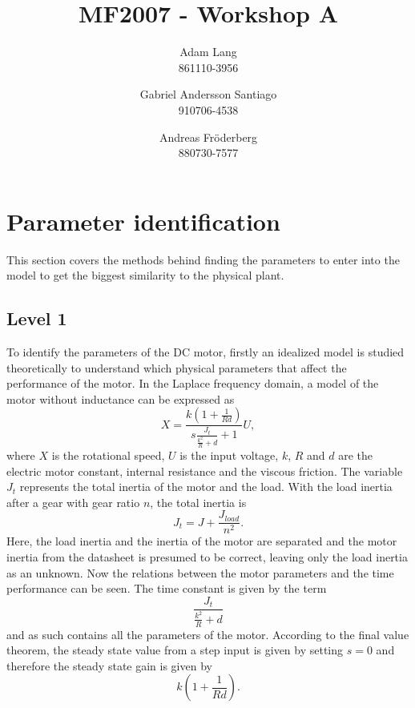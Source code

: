 \documentclass[12pt,a4paper]{article}
\title{MF2007 - Workshop A}
\author{
Adam Lang \\ 861110-3956
\and
Gabriel Andersson Santiago \\ 910706-4538
\and 
Andreas Fr\"oderberg \\ 880730-7577
}
\begin{document}
\maketitle

\section*{Parameter identification}
This section covers the methods behind finding the parameters to enter into the
model to get the biggest similarity to the physical plant.

\subsection*{Level 1}
To identify the parameters of the DC motor, firstly an idealized model is
studied theoretically to understand which physical parameters that affect the
performance of the motor. In the Laplace frequency domain, a model of the motor
without inductance can be expressed as 
\begin{equation}
    \label{eq:motormodel}
    X = \frac {k (1 + \frac{1}{Rd})} {s \frac {J_t} { \frac {k^2} {R} + d} + 1}
    U,
\end{equation}
where $X$ is the rotational speed, $U$ is the input voltage, $k$, $R$ and $d$
are the electric motor constant, internal resistance and the viscous friction.
The variable $J_t$ represents the total inertia of the motor and the load. With
the load inertia after a gear with gear ratio $n$, the total inertia is
\begin{equation}
    \label{eq:inertia}
    J_t = J + \frac{J_{load}}{n^2}.
\end{equation}
Here, the load inertia and the inertia of the motor are separated and the motor
inertia from the datasheet is presumed to be correct, leaving only the load
inertia as an unknown.  Now the relations between the motor parameters and the
time performance can be seen. The time constant is given by the term
\begin{equation}
    \label{eq:timeconstant}
    \frac {J_t} { \frac {k^2} {R} + d}
\end{equation}
and as such contains all the parameters of the motor. According to the final
value theorem, the steady state value from a step input is given by setting
$s=0$ and therefore the steady state gain is given by 
\begin{equation}
    \label{eq:steadystate}
    k (1 + \frac{1}{Rd}).
\end{equation}
\end{document}
